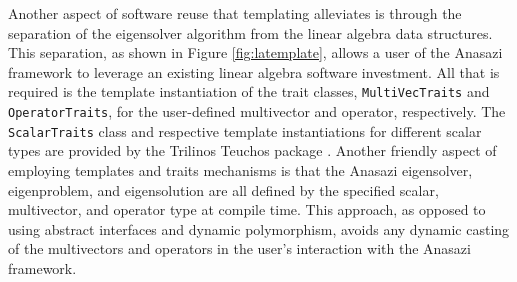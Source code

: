 \documentclass[acmtoms]{acmtrans2m}
\newcounter{algorithm}
\newcommand{\aspace}[1]{\texttt{#1}}
\begin{document}
Another aspect of software reuse that templating alleviates is through the separation of the
eigensolver algorithm from the linear algebra data structures.  This separation, as shown in
Figure \ref{fig:latemplate}, allows a user of the Anasazi framework to leverage an existing 
linear algebra software investment.  All that is required is the template instantiation of the trait
classes, \aspace{MultiVecTraits} and \aspace{OperatorTraits}, for the user-defined multivector 
and operator, respectively.  The \aspace{ScalarTraits} class and respective template 
instantiations for different scalar types are provided by the Trilinos Teuchos package 
\cite{Trilinos:Teuchos}. Another friendly aspect of employing templates and traits mechanisms
is that the Anasazi eigensolver, eigenproblem, and eigensolution are all defined by the 
specified scalar, multivector, and operator type at compile time.  This approach, as opposed to
using abstract interfaces and dynamic polymorphism, avoids any dynamic casting of the multivectors 
and operators in the user's interaction with the Anasazi framework.


\end{document}

